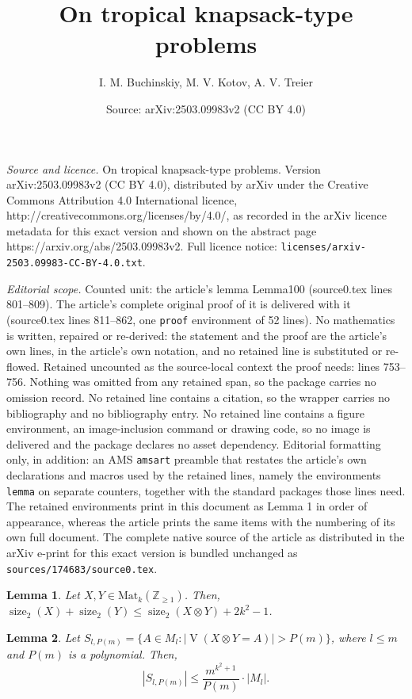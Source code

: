 \documentclass[10pt,a4paper]{amsart}
\title{On tropical knapsack-type problems}
\author{I. M. Buchinskiy, M. V. Kotov, A. V. Treier}
\date{Source: arXiv:2503.09983v2 (CC BY 4.0)}
\newtheorem{lemma}{Lemma}
\newcommand{\Mat}{\mathrm{Mat}}
\DeclareMathOperator{\V}{\mathrm{V}}
\DeclareMathOperator{\size}{size}
\begin{document}
\maketitle

\noindent\emph{Source and licence.} On tropical knapsack-type problems. Version arXiv:2503.09983v2 (CC BY 4.0), distributed by arXiv under the Creative Commons Attribution 4.0 International licence, http://creativecommons.org/licenses/by/4.0/, as recorded in the arXiv licence metadata for this exact version and shown on the abstract page https://arxiv.org/abs/2503.09983v2. Full licence notice: \texttt{licenses/arxiv-2503.09983-CC-BY-4.0.txt}.\par\smallskip

\noindent\textit{Editorial scope.} Counted unit: the article's lemma Lemma100 (source0.tex lines 801--809). The article's complete original proof of it is delivered with it (source0.tex lines 811--862, one \texttt{proof} environment of 52 lines). No mathematics is written, repaired or re-derived: the statement and the proof are the article's own lines, in the article's own notation, and no retained line is substituted or re-flowed.  Retained uncounted as the source-local context the proof needs: lines 753--756.  Nothing was omitted from any retained span, so the package carries no omission record.  No retained line contains a citation, so the wrapper carries no bibliography and no bibliography entry.  No retained line contains a figure environment, an image-inclusion command or drawing code, so no image is delivered and the package declares no asset dependency.  Editorial formatting only, in addition: an AMS \texttt{amsart} preamble that restates the article's own declarations and macros used by the retained lines, namely the environments \texttt{lemma} on separate counters, together with the standard packages those lines need.  The retained environments print in this document as Lemma 1 in order of appearance, whereas the article prints the same items with the numbering of its own full document.  The complete native source of the article as distributed in the arXiv e-print for this exact version is bundled unchanged as \texttt{sources/174683/source0.tex}.
\begin{lemma}\label{LemmaGen13}
Let $X, Y \in \Mat_k(\mathbb{Z}_{\geq 1})$. 
Then, $\size_2(X) + \size_2(Y) \leq \size_2(X \otimes Y) + 2k^2 - 1$. 
\end{lemma}

\begin{lemma}\label{Lemma100}
Let $S_{l, P(m)} = \{A \in M_l : |\!\V(X \otimes Y = A)| > P(m)\}$,
where $l \leq m$ and $P(m)$ is a polynomial. Then,
\begin{equation}
\label{FormulaLemmaGen14}
|S_{l, P(m)}| \leq \frac{m^{k^2 + 1}}{P(m)}
\cdot|M_l|.
\end{equation}
\end{lemma}
\end{document}
